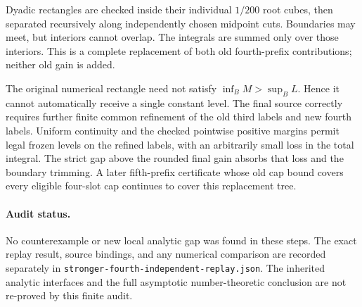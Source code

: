 Dyadic rectangles are checked inside their individual $1/200$ root
cubes, then separated recursively along independently chosen midpoint
cuts. Boundaries may meet, but interiors cannot overlap. The integrals
are summed only over those interiors. This is a complete replacement
of both old fourth-prefix contributions; neither old gain is added.

The original numerical rectangle need not satisfy
$\inf_B M>\sup_B L$. Hence it cannot automatically receive a single
constant level. The final source correctly requires further finite
common refinement of the old third labels and new fourth labels.
Uniform continuity and the checked pointwise positive margins permit
legal frozen levels on the refined labels, with an arbitrarily small
loss in the total integral. The strict gap above the rounded final
gain absorbs that loss and the boundary trimming. A later fifth-prefix
certificate whose old cap bound covers every eligible four-slot cap
continues to cover this replacement tree.

\paragraph{Audit status.}
No counterexample or new local analytic gap was found in these steps.
The exact replay result, source bindings, and any numerical comparison
are recorded separately in
\texttt{stronger-fourth-independent-replay.json}. The inherited analytic
interfaces and the full asymptotic number-theoretic conclusion are not
re-proved by this finite audit.

